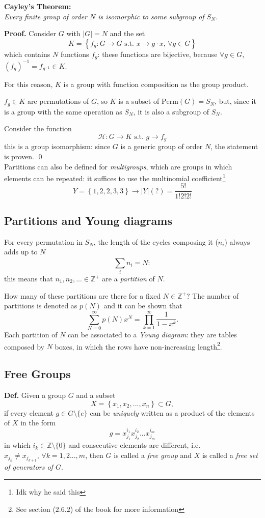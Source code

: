 \textbf{Cayley's Theorem:}\\
\textit{Every finite group of order $N$ is isomorphic to some subgroup of $S_N$.}

\textbf{Proof.} Consider $G$ with $|G|=N$ and the set
$$K = \left\{f_g: G\to G \text{ s.t. } x\to g\cdot x\text{, }\forall g\in G\right\}$$
which contains $N$ functions $f_g$: these functions are bijective, because $\forall g
\in G$, $(f_g)^{-1} = f_{g^{-1}}\in K$.

For this reason, $K$ is a group with function composition as the group product.

$f_g\in K$ are permutations of $G$, so $K$ is a subset of $\text{Perm}(G) = S_N$,
but, since it is a group with the same operation as $S_N$, it is also a subgroup of
$S_N$.

Consider the function
$$\mathcal{H}:G\to K \text{ s.t. }g\to f_g$$
this is a group isomorphism: since $G$ is a generic group of order $N$, the statement
is proven. \qed\\

Partitions can also be defined for \textit{multigroups}, which are groups in which
elements can be repeated: it suffices to use the multinomial coefficient\footnote{
Idk why he said this}
$$Y = \left\{1,2,2,3,3\right\} \rightarrow |Y|(?) = \frac{5!}{1!2!2!}$$

\subsection{Partitions and Young diagrams}
For every permutation in $S_N$, the length of the cycles composing it ($n_i$) always
adds up to $N$
$$\sum_{i}^{}n_i=N:$$
this means that $n_1,n_2,...\in\mathbb{Z}^+$ are a \textit{partition} of $N$.

How many of these partitions are there for a fixed $N\in\mathbb{Z}^+$? The number of
partitions is denoted as $p(N)$ and it can be shown that
$$\sum_{N=0}^{\infty}p(N)x^N = \prod_{k=1}^{\infty}\frac{1}{1-x^k}.$$
Each partition of $N$ can be associated to a \textit{Young diagram}: they are tables
composed by $N$ boxes, in which the rows have non-increasing length\footnote{
See section ($2.6.2$) of the book for more information}. 

\subsection{Free Groups}
\textbf{Def.} Given a group $G$ and a subset
$$X = \left\{x_1,x_2,...,x_n\right\}\subset G,$$
if every element $g\in G \setminus \{e\}$ can be \textit{uniquely} written as a
product of the elements of $X$ in the form
$$g = x^{i_1}_{j_1}x^{i_2}_{j_2}...x^{i_m}_{j_m}$$
in which $i_k\in\mathbb{Z}\setminus\{0\}$ and consecutive elements are different,
i.e. $x_{j_k}\neq x_{j_{k+1}}\text{, }\forall k=1,2...,m$, then $G$ is called a
\textit{free group} and $X$ is called a \textit{free set of generators of $G$}.

